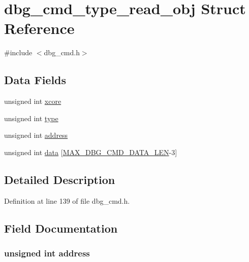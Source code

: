 \hypertarget{structdbg__cmd__type__read__obj}{\section{dbg\-\_\-cmd\-\_\-type\-\_\-read\-\_\-obj Struct Reference}
\label{structdbg__cmd__type__read__obj}
}


{\ttfamily \#include $<$dbg\-\_\-cmd.\-h$>$}

\subsection*{Data Fields}
\begin{DoxyCompactItemize}
\item 
unsigned int \hyperlink{structdbg__cmd__type__read__obj_a78357326dd562d441c3c73f5676ac638}{xcore}
\item 
unsigned int \hyperlink{structdbg__cmd__type__read__obj_a4bfea42429249a1f65204f0c0f34704a}{type}
\item 
unsigned int \hyperlink{structdbg__cmd__type__read__obj_a2f55ff1f6cd45ca1b6431493ab5614eb}{address}
\item 
unsigned int \hyperlink{structdbg__cmd__type__read__obj_a728dc245dc576de10147524d6a701ef3}{data} \mbox{[}\hyperlink{dbg__cmd_8h_a4552ec15033c8a68870cdf80eda5470c}{M\-A\-X\-\_\-\-D\-B\-G\-\_\-\-C\-M\-D\-\_\-\-D\-A\-T\-A\-\_\-\-L\-E\-N}-\/3\mbox{]}
\end{DoxyCompactItemize}


\subsection{Detailed Description}


Definition at line 139 of file dbg\-\_\-cmd.\-h.



\subsection{Field Documentation}
\hypertarget{structdbg__cmd__type__read__obj_a2f55ff1f6cd45ca1b6431493ab5614eb}{
\subsubsection[{address}]{\setlength{\rightskip}{0pt plus 5cm}unsigned int address}}\label{structdbg__cmd__type__read__obj_a2f55ff1f6cd45ca1b6431493ab5614eb}


